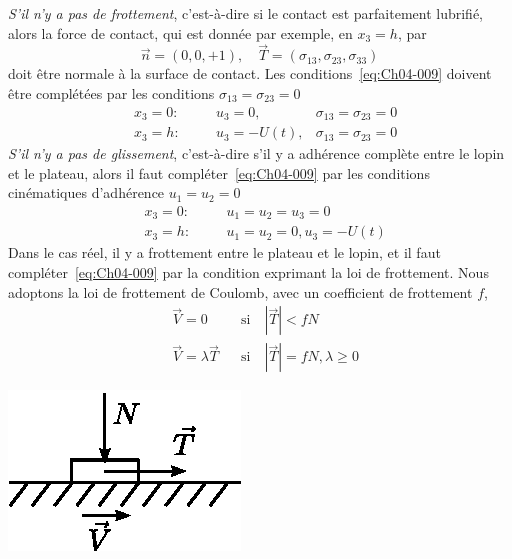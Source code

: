 \emph{S'il n'y a pas de frottement}, c'est-à-dire si le contact est parfaitement lubrifié, alors la force de contact, qui est donnée par exemple, en $x_3=h$, par
\begin{equation}
    \vec{n} = \left( 0,0,+1 \right), \quad \vec{T} = \left( \sigma_{13}, \sigma_{23}, \sigma_{33} \right)
    \label{eq:Ch04-010}
\end{equation}
doit être normale à la surface de contact.
Les conditions~\eqref{eq:Ch04-009} doivent être complétées par les conditions $\sigma_{13} = \sigma_{23} = 0$
\begin{equation}
    \begin{aligned}
        &x_3 = 0:\quad && u_3 = 0, & \sigma_{13} = \sigma_{23} = 0 \\
        &x_3 = h: && u_3 = -U(t), & \sigma_{13} = \sigma_{23} = 0
    \end{aligned}
    \label{eq:Ch04-011}
\end{equation}
\emph{S'il n'y a pas de glissement}, c'est-à-dire s'il y a adhérence complète entre le lopin et le plateau, alors il faut compléter~\eqref{eq:Ch04-009} par les conditions cinématiques d'adhérence $u_1 = u_2 = 0$
\begin{equation}
    \begin{aligned}
        &x_3 = 0:\quad&& u_1 = u_2 = u_3 = 0 \\
        &x_3 = h: && u_1 = u_2 = 0, u_3 = -U(t)
    \end{aligned}
    \label{eq:Ch04-012}
\end{equation}
Dans le cas réel, il y a frottement entre le plateau et le lopin, et il faut compléter~\eqref{eq:Ch04-009} par la condition exprimant la loi de frottement. 
Nous adoptons la loi de frottement de Coulomb, avec un coefficient de frottement $f$,
\begin{equation}
    \begin{aligned}
        &\vec{V} = 0 && \text{si}\quad |\vec{T}| < fN \\
        &\vec{V} = \lambda \vec{T} && \text{si} \quad |\vec{T}| = fN, \lambda \geq 0
    \end{aligned}
    \label{eq:Ch04-013}
\end{equation}

    \begin{center}
        \includegraphics{../images/T1_Ch04-0003}
    \end{center}

